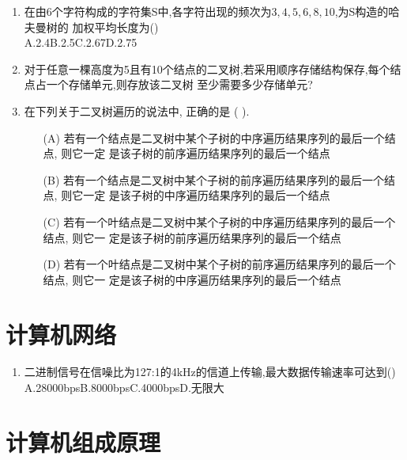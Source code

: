 \documentclass[12pt, a4paper, oneside, UTF8]{ctexbook}
\begin{document}
\begin{enumerate}
    \item 在由6个字符构成的字符集S中,各字符出现的频次为\underline{$3,4,5,6,8,10$},为S构造的哈夫曼树的
    加权平均长度为() \\
    A.2.4\qquad\qquad B.2.5\qquad\qquad C.2.67\qquad\qquad D.2.75

    \item 对于任意一棵高度为5且有10个结点的二叉树,若采用顺序存储结构保存,每个结点占一个存储单元,则存放该二叉树
    至少需要多少存储单元? 

    \item 在下列关于二叉树遍历的说法中, 正确的是 (   ).
    \begin{enumerate}
        \item[(A)]若有一个结点是二叉树中某个子树的中序遍历结果序列的最后一个结点, 则它一定
        是该子树的前序遍历结果序列的最后一个结点
        \item[(B)] 若有一个结点是二叉树中某个子树的前序遍历结果序列的最后一个结点, 则它一定
        是该子树的中序遍历结果序列的最后一个结点
        \item[(C)]若有一个叶结点是二叉树中某个子树的中序遍历结果序列的最后一个结点, 则它一
        定是该子树的前序遍历结果序列的最后一个结点
        \item[(D)] 若有一个叶结点是二叉树中某个子树的前序遍历结果序列的最后一个结点, 则它一
        定是该子树的中序遍历结果序列的最后一个结点
    \end{enumerate}

\end{enumerate}
\section{计算机网络}
\begin{enumerate}
    
    \item 二进制信号在信噪比为127:1的4kHz的信道上传输,最大数据传输速率可达到() \\
    A.28000bps\qquad B.8000bps\qquad C.4000bps\qquad D.无限大


\end{enumerate}

\section{计算机组成原理}
\end{document}
